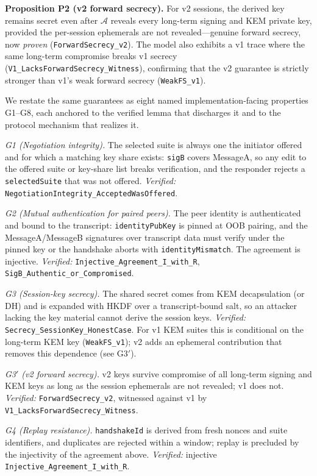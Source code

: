 \documentclass[10pt,journal,compsoc]{IEEEtran}
\begin{document}
\textbf{Proposition P2 (v2 forward secrecy).} For v2 sessions, the
derived key remains secret even after $\mathcal{A}$ reveals every
long-term signing and KEM private key, provided the per-session
ephemerals are not revealed---genuine forward secrecy, now \emph{proven}
(\texttt{ForwardSecrecy\_v2}). The model also exhibits a v1 trace where
the same long-term compromise breaks v1 secrecy
(\texttt{V1\_LacksForwardSecrecy\_Witness}), confirming that the v2
guarantee is strictly stronger than v1's weak forward secrecy
(\texttt{WeakFS\_v1}).

We restate the same guarantees as eight named implementation-facing
properties G1--G8, each anchored to the verified lemma that discharges
it and to the protocol mechanism that realizes it.

\emph{G1 (Negotiation integrity).} The selected suite is always one the
initiator offered and for which a matching key share exists: \texttt{sigB}
covers MessageA, so any edit to the offered suite or key-share list
breaks verification, and the responder rejects a \texttt{selectedSuite}
that was not offered. \emph{Verified:}
\texttt{NegotiationIntegrity\_AcceptedWasOffered}.

\emph{G2 (Mutual authentication for paired peers).} The peer identity is
authenticated and bound to the transcript: \texttt{identityPubKey} is
pinned at OOB pairing, and the MessageA/MessageB signatures over
transcript data must verify under the pinned key or the handshake aborts
with \texttt{identityMismatch}. The agreement is injective.
\emph{Verified:} \texttt{Injective\_Agreement\_I\_with\_R},
\texttt{SigB\_Authentic\_or\_Compromised}.

\emph{G3 (Session-key secrecy).} The shared secret comes from KEM
decapsulation (or DH) and is expanded with HKDF over a transcript-bound
salt, so an attacker lacking the key material cannot derive the session
keys. \emph{Verified:} \texttt{Secrecy\_SessionKey\_HonestCase}. For v1
KEM suites this is conditional on the long-term KEM key
(\texttt{WeakFS\_v1}); v2 adds an ephemeral contribution that removes
this dependence (see G3$'$).

\emph{G3$'$ (v2 forward secrecy).} v2 keys survive compromise of all
long-term signing and KEM keys as long as the session ephemerals are not
revealed; v1 does not. \emph{Verified:} \texttt{ForwardSecrecy\_v2},
witnessed against v1 by \texttt{V1\_LacksForwardSecrecy\_Witness}.

\emph{G4 (Replay resistance).} \texttt{handshakeId} is derived from fresh
nonces and suite identifiers, and duplicates are rejected within a
window; replay is precluded by the injectivity of the agreement above.
\emph{Verified:} injective \texttt{Injective\_Agreement\_I\_with\_R}.
\end{document}
